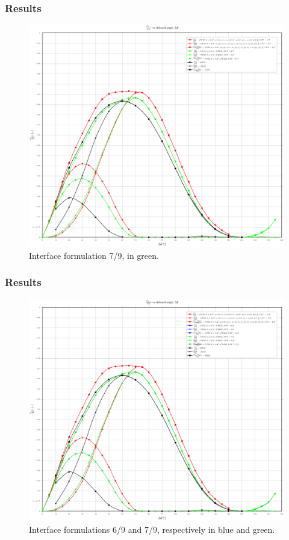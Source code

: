 \documentclass[first,firstsupp,lastsupp,handout,last,hyperref,table]{ETHclass}
\begin{document}
\begin{frame}
\frametitle{Results}
\vspace{-0.7cm}
\centering
\captionsetup[figure]{font=scriptsize,labelfont=scriptsize}
\begin{figure}[!h]
\centering
\includegraphics[height=0.7\textheight]{2017-06-01_AbqRunSummary_GsoverG0_FEM-ConnCRF-BEM-comparison.pdf}
  \caption{\scriptsize Interface formulation 7/9, in green.}
  \label{fig:res5}
\end{figure}
\end{frame}

\begin{frame}
\frametitle{Results}
\vspace{-0.7cm}
\centering
\captionsetup[figure]{font=scriptsize,labelfont=scriptsize}
\begin{figure}[!h]
\centering
\includegraphics[height=0.7\textheight]{2017-06-01_AbqRunSummary_GsoverG0_FEM-ConnCRF-EqRF-BEM-comparison.pdf}
  \caption{\scriptsize Interface formulations 6/9 and 7/9, respectively in blue and green.}
  \label{fig:res6}
\end{figure}
\end{frame}
\end{document}
